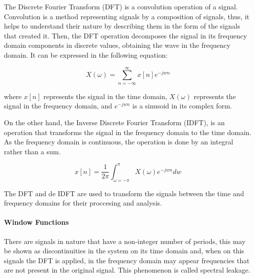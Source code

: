 The Discrete Fourier Transform (DFT) is a convolution operation of a signal. Convolution is a method representing signals by a composition of signals, thus, it helps to understand their nature by describing them in the form of the signals that created it. Then, the DFT operation decomposes the signal in its frequency domain components in discrete values, obtaining the wave in the frequency domain. It can be expressed in the following equation:

$$X(\omega) = \sum_{n = - \infty}^{\infty} x[n]e^{-jwn}$$

where $x[n]$ represents the signal in the time domain, $X(\omega)$ represents the signal in the frequency domain, and $e^{-jwn}$ is a sinusoid in its complex form.

On the other hand, the Inverse Discrete Fourier Transform (IDFT), is an operation that transforms the signal in the frequency domain to the time domain. As the frequency domain is continuous, the operation is done by an integral rather than a sum.

$$ x[n]= \frac{1}{2\pi}\int_{\omega = - \pi}^{\pi} X(\omega)e^{-jwn} dw$$

The DFT and de IDFT are used to transform the signals between the time and frequency domains for their proccesing and analysis.

\paragraph{Window Functions}
 There are signals in nature that have a non-integer number of periods, this may be shown as discontinuities in the system on its time domain and, when on this signals the DFT is applied, in the frequency domain may appear frequencies that are not present in the original signal. This phenomenon is called spectral leakage. 

